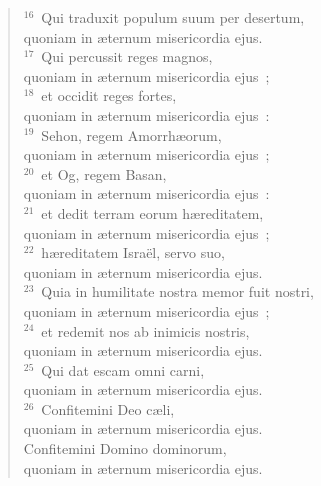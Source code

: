 \begin{flushleft}
\begin{verse}
${}^{16}$~Qui traduxit populum suum per desertum,\\ quoniam in \ae ternum misericordia ejus.\\
${}^{17}$~Qui percussit reges magnos,\\ quoniam in \ae ternum misericordia ejus~;\\
${}^{18}$~et occidit reges fortes,\\ quoniam in \ae ternum misericordia ejus~:\\
${}^{19}$~Sehon, regem Amorrh\ae orum,\\ quoniam in \ae ternum misericordia ejus~;\\
${}^{20}$~et Og, regem Basan,\\ quoniam in \ae ternum misericordia ejus~:\\
${}^{21}$~et dedit terram eorum h\ae reditatem,\\ quoniam in \ae ternum misericordia ejus~;\\
${}^{22}$~h\ae reditatem Isra\"el, servo suo,\\ quoniam in \ae ternum misericordia ejus.\\
${}^{23}$~Quia in humilitate nostra memor fuit nostri,\\ quoniam in \ae ternum misericordia ejus~;\\
${}^{24}$~et redemit nos ab inimicis nostris,\\ quoniam in \ae ternum misericordia ejus.\\
${}^{25}$~Qui dat escam omni carni,\\ quoniam in \ae ternum misericordia ejus.\\
${}^{26}$~Confitemini Deo c\ae li,\\ quoniam in \ae ternum misericordia ejus.\\ Confitemini Domino dominorum,\\ quoniam in \ae ternum misericordia ejus.\end{verse}\end{flushleft}



